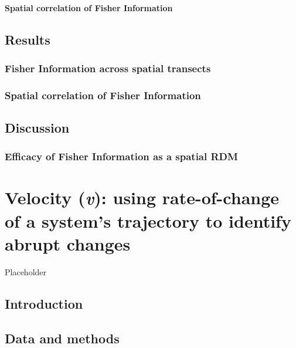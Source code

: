 \documentclass[12pt,twoside,openany]{reedthesis}
\begin{document}
\subsubsection{Spatial correlation of Fisher
Information}\label{spatial-correlation-of-fisher-information}

\section{Results}\label{results-1}

\subsection{Fisher Information across spatial
transects}\label{fisher-information-across-spatial-transects}

\subsection{Spatial correlation of Fisher
Information}\label{spatial-correlation-of-fisher-information-1}

\section{Discussion}\label{discussion-1}

\subsection{Efficacy of Fisher Information as a spatial
RDM}\label{efficacy-of-fisher-information-as-a-spatial-rdm}

\chapter{\texorpdfstring{Velocity (\emph{v}): using rate-of-change of a
system's trajectory to identify abrupt
changes}{Velocity (v): using rate-of-change of a system's trajectory to identify abrupt changes}}\label{velocity}

Placeholder

\section{Introduction}\label{introduction-3}

\section{Data and methods}\label{data-and-methods-1}
\end{document}
